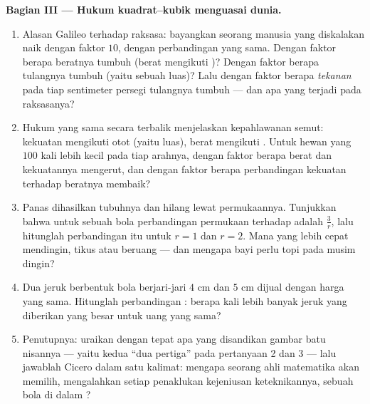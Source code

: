\begin{problem}
\medskip
\noindent\textbf{Bagian III --- Hukum kuadrat--kubik menguasai
dunia.}
\begin{enumerate}[resume]
  \item Alasan Galileo terhadap raksasa: bayangkan seorang manusia
        yang diskalakan naik dengan faktor $10$, dengan perbandingan
        yang sama. Dengan faktor berapa beratnya tumbuh (berat
        mengikuti )? Dengan faktor berapa  tulangnya
        tumbuh (yaitu sebuah luas)? Lalu dengan faktor berapa
        \emph{tekanan} pada tiap sentimeter persegi tulangnya
        tumbuh --- dan apa yang terjadi pada raksasanya?
  \item Hukum yang sama secara terbalik menjelaskan kepahlawanan
        semut: kekuatan mengikuti  otot (yaitu luas), berat
        mengikuti . Untuk hewan yang $100$ kali lebih kecil
        pada tiap arahnya, dengan faktor berapa berat dan kekuatannya
        mengerut, dan dengan faktor berapa perbandingan kekuatan
        terhadap beratnya membaik?
  \item Panas dihasilkan  tubuhnya dan hilang lewat
        permukaannya. Tunjukkan bahwa untuk sebuah bola perbandingan
        permukaan terhadap  adalah $\frac{3}{r}$, lalu
        hitunglah perbandingan itu untuk $r = 1$ dan $r = 2$. Mana
        yang lebih cepat mendingin, tikus atau beruang --- dan
        mengapa bayi perlu topi pada musim dingin?
  \item Dua jeruk berbentuk bola berjari-jari $4$ cm dan $5$ cm
        dijual dengan harga yang sama. Hitunglah perbandingan
        : berapa kali lebih banyak jeruk yang diberikan
        yang besar untuk uang yang sama?
  \item Penutupnya: uraikan dengan tepat apa yang disandikan gambar
        batu nisannya --- yaitu kedua ``dua pertiga'' pada pertanyaan
        2 dan 3 --- lalu jawablah Cicero dalam satu kalimat: mengapa
        seorang ahli matematika akan memilih, mengalahkan setiap
        penaklukan kejeniusan keteknikannya, sebuah bola di dalam
        ?

\end{enumerate}
\end{problem}
